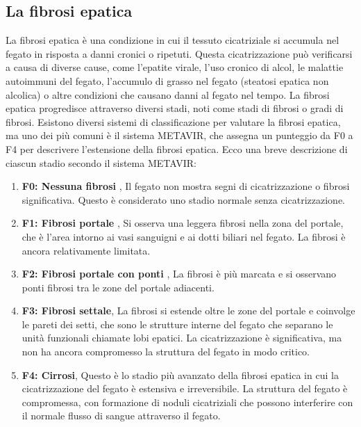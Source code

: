 \documentclass[italian,12pt,a4paper]{article}
\begin{document}
	
	\subsection{La fibrosi epatica}
 
    La fibrosi epatica è una condizione in cui il tessuto cicatriziale si accumula nel fegato in risposta a danni cronici o ripetuti. Questa cicatrizzazione può verificarsi a causa di diverse cause, come l'epatite virale, l'uso cronico di alcol, le malattie autoimmuni del fegato, l'accumulo di grasso nel fegato (steatosi epatica non alcolica) o altre condizioni che causano danni al fegato nel tempo.
    La fibrosi epatica progredisce attraverso diversi stadi, noti come stadi di fibrosi o gradi di fibrosi. Esistono diversi sistemi di classificazione per valutare la fibrosi epatica, ma uno dei più comuni è il sistema METAVIR, che assegna un punteggio da F0 a F4 per descrivere l'estensione della fibrosi epatica. Ecco una breve descrizione di ciascun stadio secondo il sistema METAVIR:
    
    
    \begin{enumerate}
		\item \textbf{F0: Nessuna fibrosi },  Il fegato non mostra segni di cicatrizzazione o fibrosi significativa. Questo è considerato uno stadio normale senza cicatrizzazione.
		\item \textbf{F1: Fibrosi portale }, Si osserva una leggera fibrosi nella zona del portale, che è l'area intorno ai vasi sanguigni e ai dotti biliari nel fegato. La fibrosi è ancora relativamente limitata.
		\item \textbf{F2: Fibrosi portale con ponti }, La fibrosi è più marcata e si osservano ponti fibrosi tra le zone del portale adiacenti.
		\item \textbf{F3: Fibrosi settale}, La fibrosi si estende oltre le zone del portale e coinvolge le pareti dei setti, che sono le strutture interne del fegato che separano le unità funzionali chiamate lobi epatici. La cicatrizzazione è significativa, ma non ha ancora compromesso la struttura del fegato in modo critico.
		\item \textbf{F4: Cirrosi}, Questo è lo stadio più avanzato della fibrosi epatica in cui la cicatrizzazione del fegato è estensiva e irreversibile. La struttura del fegato è compromessa, con formazione di noduli cicatriziali che possono interferire con il normale flusso di sangue attraverso il fegato.
	\end{enumerate} 

    \vspace{25pt}
    
\end{document}
